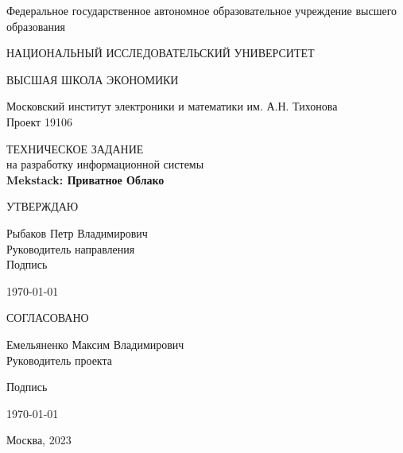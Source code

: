 \documentclass[14pt, a4paper]{extarticle}
\date{\today}
\begin{document}

\begin{titlepage}
    \begin{center}
        Федеральное государственное автономное образовательное учреждение высшего
        образования\par
        НАЦИОНАЛЬНЫЙ ИССЛЕДОВАТЕЛЬСКИЙ УНИВЕРСИТЕТ\par ВЫСШАЯ ШКОЛА ЭКОНОМИКИ\par
        \vspace{1cm}
        Московский институт электроники и математики им. А.Н. Тихонова \\
        \vspace{1cm}
        Проект 19106 \\
        \vspace{2cm}
    \end{center}

    \begin{center}
        ТЕХНИЧЕСКОЕ ЗАДАНИЕ \\
        на разработку информационной системы \\
        \textbf{Mekstack: Приватное Облако} \\
    \end{center}
    \vfill

    \begin{minipage}[t]{0.5\textwidth}
        \begin{center}
        УТВЕРЖДАЮ
        \end{center}
        \begin{flushleft}
        Рыбаков Петр Владимирович\\
        Руководитель направления\\

        \vspace{0.5cm}
        Подпись
        \vspace{0.5cm}

        \today
        \end{flushleft}
    \end{minipage}%

    \vspace{2cm}

    \begin{minipage}[t]{0.5\textwidth}
        \begin{center}
        СОГЛАСОВАНО
        \end{center}
        \begin{flushleft}
        Емельяненко Максим Владимирович\\
        Руководитель проекта

        \vspace{0.5cm}
        Подпись
        \vspace{0.5cm}

        \today
        \end{flushleft}
    \end{minipage}%

    \vspace{2cm}
    \center
    Москва, 2023
\end{titlepage}
\end{document}

